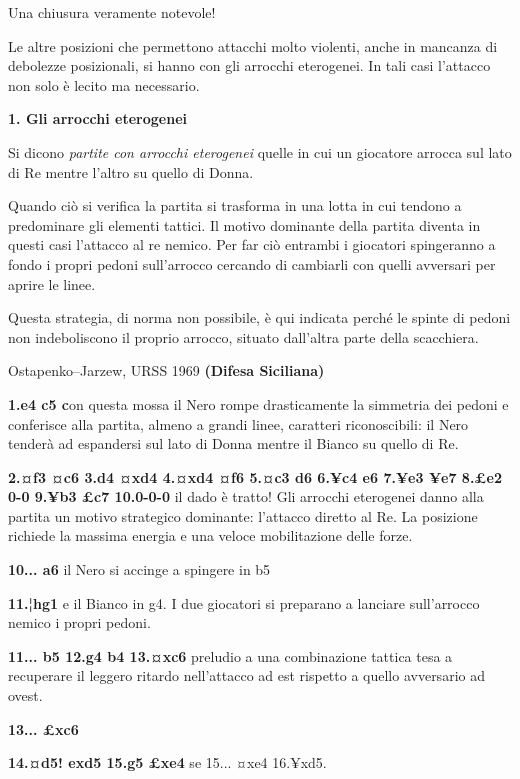 
Una chiusura veramente notevole!

Le altre posizioni che permettono attacchi molto violenti, anche in
mancanza di debolezze posizionali, si hanno con gli arrocchi eterogenei.
In tali casi l'attacco non solo è lecito ma necessario.

\textbf{1. Gli arrocchi eterogenei}

Si dicono \emph{partite con arrocchi eterogenei} quelle in cui un
giocatore arrocca sul lato di Re mentre l'altro su quello di Donna.

Quando ciò si verifica la partita si trasforma in una lotta in cui
tendono a predominare gli elementi tattici. Il motivo dominante della
partita diventa in questi casi l'attacco al re nemico. Per far ciò
entrambi i giocatori spingeranno a fondo i propri pedoni sull'arrocco
cercando di cambiarli con quelli avversari per aprire le linee.

Questa strategia, di norma non possibile, è qui indicata perché le
spinte di pedoni non indeboliscono il proprio arrocco, situato
dall'altra parte della scacchiera.

Ostapenko--Jarzew, URSS 1969 \textbf{(Difesa Siciliana)}

\textbf{1.e4 c5 c}on questa mossa il Nero rompe drasticamente la
simmetria dei pedoni e conferisce alla partita, almeno a grandi linee,
caratteri riconoscibili: il Nero tenderà ad espandersi sul lato di Donna
mentre il Bianco su quello di Re.

\textbf{2.¤f3 ¤c6 3.d4 ¤xd4 4.¤xd4 ¤f6 5.¤c3 d6 6.¥c4 e6 7.¥e3 ¥e7 8.£e2
0-0 9.¥b3 £c7 10.0-0-0} il dado è tratto! Gli arrocchi eterogenei danno
alla partita un motivo strategico dominante: l'attacco diretto al Re. La
posizione richiede la massima energia e una veloce mobilitazione delle
forze.

\textbf{10... a6} il Nero si accinge a spingere in b5

\textbf{11.¦hg1} e il Bianco in g4. I due giocatori si preparano a
lanciare sull'arrocco nemico i propri pedoni.

\textbf{11... b5 12.g4 b4 13.¤xc6} preludio a una combinazione tattica
tesa a recuperare il leggero ritardo nell'attacco ad est rispetto a
quello avversario ad ovest.

\textbf{13... £xc6}


\textbf{14.¤d5! exd5 15.g5 £xe4} se 15... ¤xe4 16.¥xd5.

